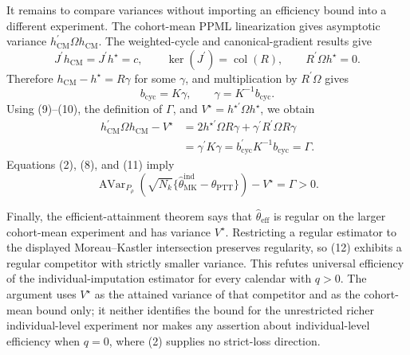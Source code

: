 It remains to compare variances without importing an efficiency bound into a different experiment.  The cohort-mean PPML linearization gives asymptotic variance \(h_{\mathrm{CM}}^{\prime}\Omega h_{\mathrm{CM}}\).  The weighted-cycle and canonical-gradient results give
\[
J^{\prime}h_{\mathrm{CM}}=J^{\prime}h^{\star}=c,
\qquad
\ker(J^{\prime})=\operatorname{col}(R),
\qquad
R^{\prime}\Omega h^{\star}=0.
\tag{9}
\]
Therefore \(h_{\mathrm{CM}}-h^{\star}=R\gamma\) for some \(\gamma\), and multiplication by \(R^{\prime}\Omega\) gives
\[
b_{\mathrm{cyc}}=K\gamma,
\qquad
\gamma=K^{-1}b_{\mathrm{cyc}}.
\tag{10}
\]
Using (9)--(10), the definition of \(\Gamma\), and
\(V^{\star}=h^{\star\prime}\Omega h^{\star}\), we obtain
\[
\begin{aligned}
h_{\mathrm{CM}}^{\prime}\Omega h_{\mathrm{CM}}-V^{\star}
&=2h^{\star\prime}\Omega R\gamma
+\gamma^{\prime}R^{\prime}\Omega R\gamma\\
&=\gamma^{\prime}K\gamma
=b_{\mathrm{cyc}}^{\prime}K^{-1}b_{\mathrm{cyc}}
=\Gamma.
\end{aligned}
\tag{11}
\]
Equations (2), (8), and (11) imply
\[
\operatorname{AVar}_{P_\rho}\!\left(
\sqrt{N_k}\{\widehat\theta_{\mathrm{MK}}^{\mathrm{ind}}
-\theta_{\mathrm{PTT}}\}\right)-V^{\star}
=\Gamma>0.
\tag{12}
\]

Finally, the efficient-attainment theorem says that \(\widehat\theta_{\mathrm{eff}}\) is regular on the larger cohort-mean experiment and has variance \(V^{\star}\).  Restricting a regular estimator to the displayed Moreau--Kastler intersection preserves regularity, so (12) exhibits a regular competitor with strictly smaller variance.  This refutes universal efficiency of the individual-imputation estimator for every calendar with \(q>0\).  The argument uses \(V^{\star}\) as the attained variance of that competitor and as the cohort-mean bound only; it neither identifies the bound for the unrestricted richer individual-level experiment nor makes any assertion about individual-level efficiency when \(q=0\), where (2) supplies no strict-loss direction.
